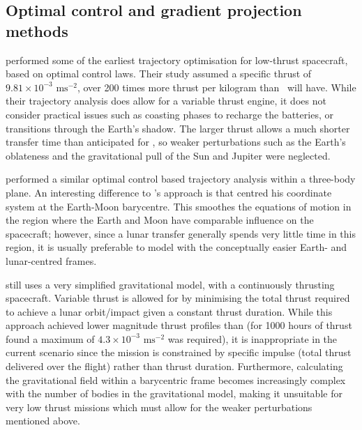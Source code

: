 \subsection{Optimal control and gradient projection methods} \label{sub:Optimal-control-lit}

\textcite{Golan1994} performed some of the earliest trajectory optimisation for low-thrust spacecraft, based on optimal control laws. Their study assumed a specific thrust of $9.81\times10^{-3}\text{ ms}^{-2}$, over 200 times more thrust per kilogram than \BW\ will have. While their trajectory analysis does allow for a variable thrust engine, it does not consider practical issues such as coasting phases to recharge the batteries, or transitions through the Earth's shadow. The larger thrust allows a much shorter transfer time than anticipated for \BW, so weaker perturbations such as the Earth's oblateness and the gravitational pull of the Sun and Jupiter were neglected.

\textcite{Guelman1995} performed a similar optimal control based trajectory analysis within a three-body plane. An interesting difference to \citeauthor{Golan1994}'s approach is that \citeauthor{Guelman1995} centred his coordinate system at the Earth-Moon barycentre. This smoothes the equations of motion in the region where the Earth and Moon have comparable influence on the spacecraft; however, since a lunar transfer generally spends very little time in this region, it is usually preferable to model with the conceptually easier Earth- and lunar-centred frames.
 
\citeauthor{Guelman1995} still uses a very simplified gravitational model, with a continuously thrusting spacecraft. Variable thrust is allowed for by minimising the total thrust required to achieve a lunar orbit/impact given a constant thrust duration. While this approach achieved lower magnitude thrust profiles than \citeauthor{Golan1994} (for 1000 hours of thrust \citeauthor{Guelman1995} found a maximum of $4.3\times10^{-3}\text{ ms}^{-2}$ was required), it is inappropriate in the current scenario since the mission is constrained by specific impulse (total thrust delivered over the flight) rather than thrust duration. Furthermore, calculating the gravitational field within a barycentric frame becomes increasingly complex with the number of bodies in the gravitational model, making it unsuitable for very low thrust missions which must allow for the weaker perturbations mentioned above.


